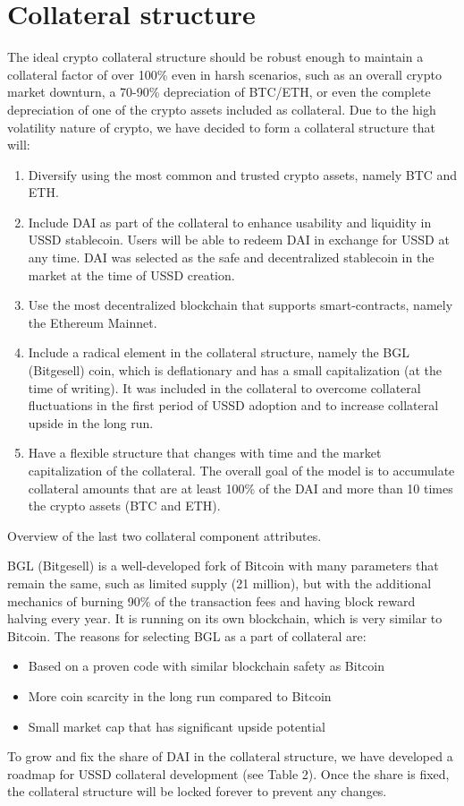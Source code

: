 
\section{Collateral structure}

The ideal crypto collateral structure should be robust enough to maintain a collateral factor 
of over 100\% even in harsh scenarios, such as an overall crypto market downturn, a 70-90\% 
depreciation of BTC/ETH, or even the complete depreciation of one of the crypto assets included 
as collateral. Due to the high volatility nature of crypto, we have decided to form a collateral 
structure that will:

\begin{enumerate}
  \item Diversify using the most common and trusted crypto assets, namely BTC and ETH.
  \item Include DAI as part of the collateral to enhance usability and liquidity in USSD stablecoin. 
  Users will be able to redeem DAI in exchange for USSD at any time. DAI was selected as the safe 
  and decentralized stablecoin in the market at the time of USSD creation.
  \item Use the most decentralized blockchain that supports smart-contracts, namely the Ethereum Mainnet.
  \item Include a radical element in the collateral structure, namely the BGL (Bitgesell) coin, 
  which is deflationary and has a small capitalization (at the time of writing). It was included 
  in the collateral to overcome collateral fluctuations in the first period of USSD adoption and 
  to increase collateral upside in the long run.
  \item Have a flexible structure that changes with time and the market capitalization of the 
  collateral. The overall goal of the model is to accumulate collateral amounts that are at least 100\% 
  of the DAI and more than 10 times the crypto assets (BTC and ETH).
\end{enumerate}

Overview of the last two collateral component attributes.

BGL (Bitgesell) is a well-developed fork of Bitcoin with many parameters that 
remain the same, such as limited supply (21 million), but with the additional 
mechanics of burning 90\% of the transaction fees and having block reward halving 
every year. It is running on its own blockchain, which is very similar to Bitcoin. 
The reasons for selecting BGL as a part of collateral are:
\begin{itemize}
  \item Based on a proven code with similar blockchain safety as Bitcoin
  \item More coin scarcity in the long run compared to Bitcoin
  \item Small market cap that has significant upside potential
\end{itemize}
To grow and fix the share of DAI in the collateral structure, we have developed a roadmap 
for USSD collateral development (see Table 2). Once the share is fixed, the collateral structure 
will be locked forever to prevent any changes.



